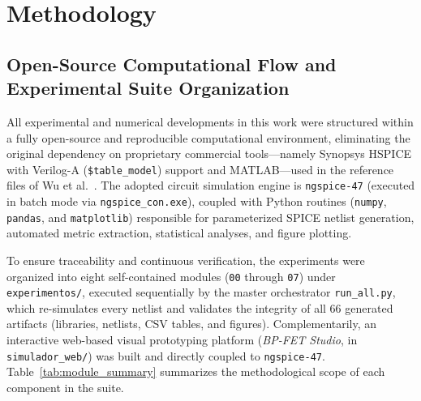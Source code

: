 \section{Methodology}\label{sec:methodology}

\subsection{Open-Source Computational Flow and Experimental Suite Organization}\label{sec:met_flow}

All experimental and numerical developments in this work were structured within a fully open-source and reproducible computational environment, eliminating the original dependency on proprietary commercial tools---namely Synopsys HSPICE with Verilog-A (\texttt{\$table\_model}) support and MATLAB---used in the reference files of Wu et al.~\cite{wu2020reconfigurable}. The adopted circuit simulation engine is \texttt{ngspice-47} (executed in batch mode via \texttt{ngspice\_con.exe}), coupled with Python routines (\texttt{numpy}, \texttt{pandas}, and \texttt{matplotlib}) responsible for parameterized SPICE netlist generation, automated metric extraction, statistical analyses, and figure plotting.

To ensure traceability and continuous verification, the experiments were organized into eight self-contained modules (\texttt{00} through \texttt{07}) under \texttt{experimentos/}, executed sequentially by the master orchestrator \texttt{run\_all.py}, which re-simulates every netlist and validates the integrity of all 66 generated artifacts (libraries, netlists, CSV tables, and figures). Complementarily, an interactive web-based visual prototyping platform (\textit{BP-FET Studio}, in \texttt{simulador\_web/}) was built and directly coupled to \texttt{ngspice-47}. Table~\ref{tab:module_summary} summarizes the methodological scope of each component in the suite.

